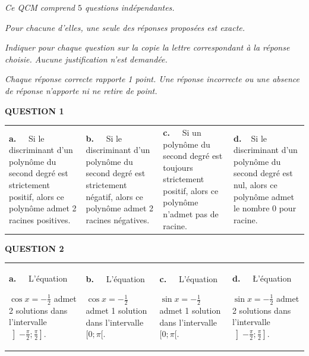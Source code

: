 \medskip

\emph{Ce QCM comprend $5$ questions indépendantes.}

\emph{Pour chacune d'elles, une seule des réponses proposées est exacte.}

\emph{Indiquer pour chaque question sur la copie la lettre correspondant à la réponse
choisie. Aucune justification n'est demandée.}

\emph{Chaque réponse correcte rapporte 1 point. Une réponse incorrecte ou une absence de réponse n'apporte ni ne retire de point.}

\medskip

\textbf{QUESTION 1}

\medskip

\begin{tabularx}{\linewidth}{*{4}{X}}
\textbf{a.~~} Si le discriminant
d'un polynôme
du second degré
est strictement
positif, alors ce
polynôme admet
2 racines
positives.&
\textbf{b.~~} Si le discriminant
d'un polynôme
du second degré
est strictement
négatif, alors ce
polynôme admet
2 racines
négatives.&
\textbf{c.~~} Si un polynôme
du second degré
est toujours
strictement
positif, alors ce
polynôme
n'admet pas de
racine.&
\textbf{d.~~}Si le discriminant
d'un polynôme
du second degré
est nul, alors ce
polynôme admet
le nombre 0 pour
racine.
\end{tabularx}

\medskip

\textbf{QUESTION 2}

\medskip

\begin{tabularx}{\linewidth}{*{4}{X}}
\begin{minipage}[t]{3.5cm}\textbf{a.~~}
L'équation

 $\cos x =-\frac{1}{2}$
admet 2 solutions dans l'intervalle
 $\left]-\frac{\pi}{2};\frac{\pi}{2}\right]$.
\end{minipage}&
\begin{minipage}[t]{3.5cm}\textbf{b.~~}
 L'équation
 
$\cos x= -\frac{1}{2}$
admet 1
solution dans
l'intervalle $[0 ; \pi[$.
\end{minipage}&
 \begin{minipage}[t]{3.5cm}\textbf{c.~~}
L'équation

$\sin x = -\frac{1}{2}$ admet 1
solution dans
l'intervalle \mbox{$[0 ; \pi[$}.
\end{minipage}&
 \begin{minipage}[t]{3.5cm}\textbf{d.~~}
\L'équation

$\sin x= -\frac{1}{2}$ admet 2
solutions dans
l'intervalle $\left]-\frac{\pi}{2} ;\frac{\pi}{2}\right]$.
\end{minipage}
\end{tabularx}

